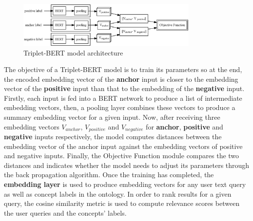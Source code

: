 \documentclass[preprint,12pt]{elsarticle}
\begin{document}
\begin{figure}[htbp]
	\centering
		\includegraphics[width=0.8\textwidth]{figures/Triplet2.eps}
	\vspace{-0.5em}
	\caption{Triplet-BERT model architecture}
	\label{fig:Triplet}
\end{figure}

The objective of a Triplet-BERT model is to train its parameters so at the end, the encoded embedding vector of the \textbf{anchor} input is closer to the embedding vector of the \textbf{positive} input than that to the embedding of the \textbf{negative} input. Firstly, each input is fed into a BERT network to produce a list of intermediate embedding vectors, then, a pooling layer combines these vectors to produce a summary embedding vector for a given input. Now, after receiving three embedding vectors $V_{anchor}$, $V_{positive}$ and $V_{negative}$ for \textbf{anchor}, \textbf{positive} and \textbf{negative} inputs respectively, the model computes distances between the embedding vector of the anchor input against the embedding vectors of positive and negative inputs. Finally, the Objective Function module compares the two distances and indicates whether the model needs to adjust its parameters through the back propagation algorithm.  
Once the training has completed, the \textbf{embedding layer} is used to produce embedding vectors for any user text query as well as concept labels in the ontology. In order to rank results for a given query, the cosine similarity metric is used to compute relevance scores between the user queries and the concepts' labels. 
 
\end{document}
